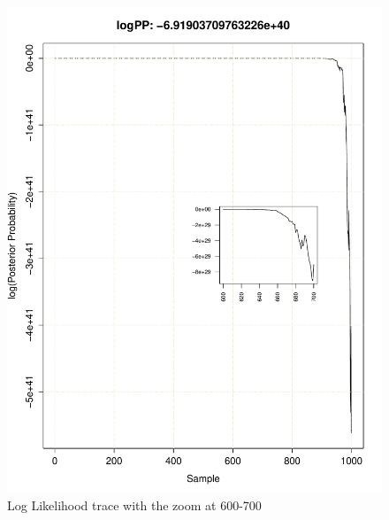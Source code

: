\documentclass[11pt]{labbook}
\begin{document}
    \begin{figure}
        \centering
        \includegraphics[scale=.75]{FONSE_Plots/2016/June_29/LogLikeTrace_600-700}
        \caption{Log Likelihood trace with the zoom at 600-700}
        \label{fig:JUN29_600-700}
    \end{figure}
\end{document}
